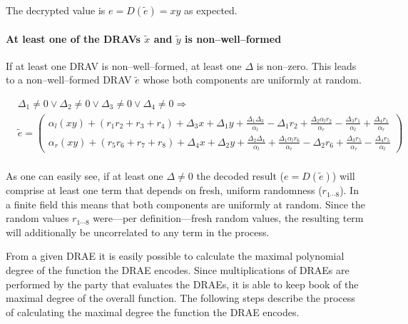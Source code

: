\noindent{}The decrypted value is $e = D(\widetilde{e}) = xy$ as expected.


\paragraph{At least one of the DRAVs $\widetilde{x}$ and $\widetilde{y}$ is
non--well--formed} If at least one DRAV is non--well--formed, at least one
$\Delta$ is non--zero. This leads to a non--well--formed DRAV $\widetilde{e}$
whose both components are uniformly at random.

\begin{align*}
  &
  \Delta_1 \neq 0 \vee \Delta_2 \neq 0 \vee
  \Delta_3 \neq 0 \vee \Delta_4 \neq 0
  \Rightarrow \\
  &
  \widetilde{e} =
  \begin{pmatrix}
    \alpha_l(xy) + (r_1r_2 + r_3 + r_4)
    + \Delta_3x + \Delta_1y
    + \frac{\Delta_1\Delta_3}{\alpha_l}
    - \Delta_1r_2
    + \frac{\Delta_2\alpha_lr_2}{\alpha_r}
    - \frac{\Delta_3r_1}{\alpha_l}
    + \frac{\Delta_4r_1}{\alpha_r}
    \\
    \alpha_r(xy) + (r_5r_6 + r_7 + r_8)
    + \Delta_4x + \Delta_2y
    + \frac{\Delta_2\Delta_4}{\alpha_l}
    + \frac{\Delta_1\alpha_lr_6}{\alpha_r}
    - \Delta_2r_6
    + \frac{\Delta_3r_5}{\alpha_r}
    - \frac{\Delta_4r_5}{\alpha_l}
  \end{pmatrix} \\
\end{align*}

\noindent{}As one can easily see, if at least one $\Delta \neq 0$ the decoded
result ($e = D(\widetilde{e})$) will comprise at least one term that depends on
fresh, uniform randomness ($r_{1 \cdots 8}$). In a finite field this means that
both components are uniformly at random. Since the random values $r_{1 \cdots
8}$ were---per definition---fresh random values, the resulting term will
additionally be uncorrelated to any term in the process.


\label{sec:max-poly-degree}

From a given DRAE it is easily possible to calculate the maximal polynomial
degree of the function the DRAE encodes. Since multiplications of DRAEs are
performed by the party that evaluates the DRAEs, it is able to keep book of the
maximal degree of the overall function. The following steps describe the process
of calculating the maximal degree the function the DRAE encodes.

